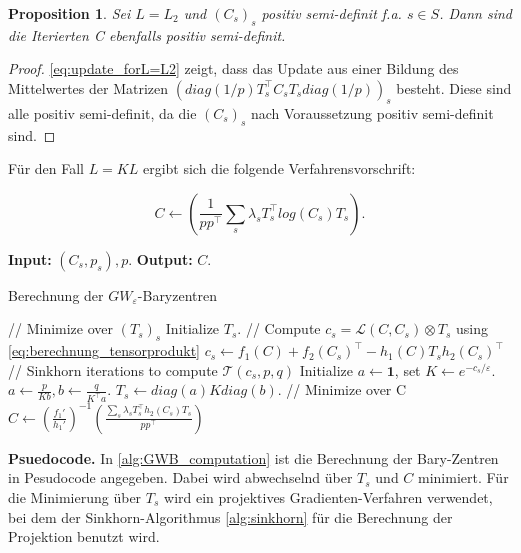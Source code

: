 \documentclass[11pt,a4paper]{article}
\newtheorem{proposition}[theorem]{Proposition}
\numberwithin{equation}{section}
\begin{document}
	\begin{proposition}
		Sei $L=L_2$ und $(C_s)_s$ positiv semi-definit f.a. $s \in S$. Dann sind die Iterierten C ebenfalls positiv semi-definit. 
	\end{proposition}
	\begin{proof}
		\autoref{eq:update_forL=L2} zeigt, dass das Update aus einer Bildung des Mittelwertes der Matrizen $(diag(1/p)T_s^\top C_s T_s diag(1/p))_s$ besteht. Diese sind alle positiv semi-definit, da die $(C_s)_s$ nach Voraussetzung positiv semi-definit sind.
	\end{proof}
	Für den Fall $L = KL$ ergibt sich die folgende Verfahrensvorschrift:
	
	\begin{equation}
	C \leftarrow \left(\frac{1}{pp^\top}\sum_s{\lambda_s T_s^\top log(C_s)T_s}\right).
	\end{equation}
	\begin{algorithm}
		\hspace*{\algorithmicindent} \textbf{Input: } $(C_s,p_s), p.$ \newline
		\hspace*{\algorithmicindent} \textbf{Output: } $C$. 
		\caption{Berechnung der $GW_{\varepsilon}$-Baryzentren}
		\label{alg:GWB_computation}
		\begin{algorithmic}
			\REPEAT 
			\STATE// Minimize over $(T_s)_s$
			\STATE Initialize $T_s$.
			\REPEAT
			\STATE // Compute $c_s = \mathcal{L}(C,C_s)\otimes T_s$ using \autoref*{eq:berechnung_tensorprodukt}
			\STATE $c_s \leftarrow f_1(C) + f_2(C_s)^\top -h_1(C)T_sh_2(C_s)^\top$
			\STATE // Sinkhorn iterations to compute $\mathcal{T}(c_s,p,q)$
			\STATE Initialize $a \leftarrow \boldsymbol{1}$, set $K \leftarrow e^{-c_s/\varepsilon}.$
			\REPEAT 
			\STATE $a \leftarrow \frac{p}{Kb}, b \leftarrow  \frac{q}{K^\top a}.$
			\STATE $T_s \leftarrow diag(a)Kdiag(b).$
			\ENDFOR 
			\STATE // Minimize over C 
			\STATE $C \leftarrow \left( \frac{f_1'}{h_1'} \right)^{-1}\left( \frac{\sum_s{\lambda_sT_s^\top h_2(C_s)T_s}}{pp^\top} \right)$ 
		\end{algorithmic}
	\end{algorithm}
	
	\noindent \textbf{Psuedocode.}
	In \autoref{alg:GWB_computation} ist die Berechnung der Bary-Zentren in Pesudocode angegeben. Dabei wird abwechselnd über $T_s$ und $C$ minimiert. Für die Minimierung über $T_s$ wird ein projektives Gradienten-Verfahren verwendet, bei dem der Sinkhorn-Algorithmus \autoref{alg:sinkhorn} für die Berechnung der Projektion benutzt wird.
\end{document}
